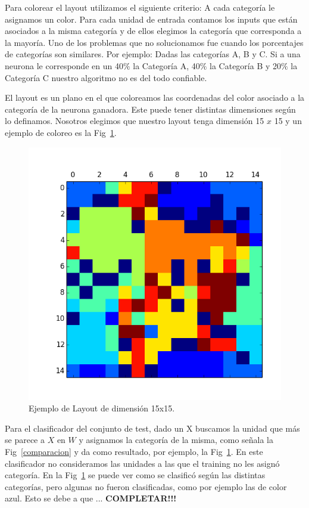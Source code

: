 Para colorear el layout utilizamos el siguiente criterio: A cada categoría le asignamos un color. Para cada unidad de entrada contamos los inputs que están asociados a la misma categoría y de ellos elegimos la categoría que corresponda a la mayoría. Uno de los problemas que no solucionamos fue cuando los porcentajes de categorías son similares. Por ejemplo: Dadas las categorías A, B y C. Si a una neurona le corresponde en un 40$\%$ la Categoría A, 40$\%$ la Categoría B y 20$\%$ la Categoría C nuestro algoritmo no es del todo confiable.

El layout es un plano en el que coloreamos las coordenadas del color asociado a la categoría de la neurona ganadora. Este puede tener distintas dimensiones según lo definamos. Nosotros elegimos que nuestro layout tenga dimensión 15 $x$ 15 y un ejemplo de coloreo es la Fig~\ref{ejemplo}.

\begin{figure}[ht!]
	\centering
	\includegraphics[width=0.7\linewidth]{img/parte2-ejemplocoloreo.png}
	\caption{Ejemplo de Layout de dimensión 15x15.}
	\label{ejemplo}
\end{figure}

Para el clasificador del conjunto de test, dado un X buscamos la unidad que más se parece a $X$ en $W$ y asignamos la categoría de la misma, como señala la Fig~\ref{comparacion} y da como resultado, por ejemplo, la Fig~\ref{ejemplo}. En este clasificador no consideramos las unidades a las que el training no les asignó categoría. En la Fig~\ref{ejemplo} se puede ver como se clasificó según las distintas categorías, pero algunas no fueron clasificadas, como por ejemplo las de color azul. Esto se debe a que ... \textbf{COMPLETAR!!!}

